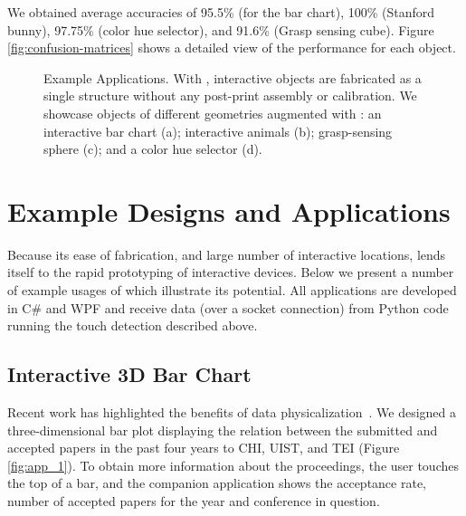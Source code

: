 			We obtained average accuracies of 95.5\% (for the bar chart), 100\%
			(Stanford bunny), 97.75\% (color hue selector), and 91.6\% (Grasp sensing
			cube). Figure \ref{fig:confusion-matrices} shows a detailed view of the
			performance for each object.

			\begin{figure*}[h]
				\centering
				 \hfill
				\caption{Example \at Applications. With \at, interactive objects are
					fabricated as a single structure without any post-print assembly or
					calibration. We showcase objects of different geometries augmented with
					\at: an interactive bar chart (a); interactive animals (b);
					grasp-sensing sphere (c); and a color hue selector (d).}
				\label{fig:apps}
			\end{figure*}

	\section{Example Designs and Applications}
		Because its ease of fabrication, and large number of interactive locations,
		\at lends itself to the rapid prototyping of interactive devices. Below we
		present a number of example usages of \at which illustrate its potential.
		All applications are developed in C\# and WPF and receive data (over a
		socket connection) from Python code running the touch detection described
		above.
		
		\newpage
		\subsection*{Interactive 3D Bar Chart}
			Recent work has highlighted the benefits of data
			physicalization~\cite{Jansen:2015cu}. We designed a three-dimensional bar
			plot displaying the relation between the submitted and accepted papers in
			the past four years to CHI, UIST, and TEI (Figure
			\ref{fig:app_1}).  To obtain more information about the proceedings, the
			user touches the top of a bar, and the companion application shows the
			acceptance rate, number of accepted papers for the year and conference in
			question.
		    
